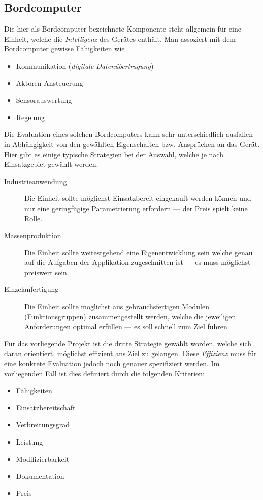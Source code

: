 \subsection{Bordcomputer}
\label{bordcomputer}
Die hier als Bordcomputer bezeichnete Komponente steht allgemein für eine
Einheit, welche die \emph{Intelligenz} des Gerätes enthält. Man assoziert
mit dem Bordcomputer gewisse Fähigkeiten wie
\begin{itemize}
	\item Kommunikation (\emph{digitale Datenübertragung})
	\item Aktoren-Ansteuerung
	\item Sensorauswertung
	\item Regelung
\end{itemize}

Die Evaluation eines solchen Bordcomputers kann sehr unterschiedlich 
ausfallen in Abhängigkeit von den gewählten Eigenschaften bzw. 
Ansprüchen an das Gerät. Hier gibt es einige typische Strategien bei der
Auswahl, welche je nach Einsatzgebiet gewählt werden.
\begin{description}
	\item[Industrieanwendung] Die Einheit sollte möglichst 
		Einsatzbereit eingekauft werden können und nur eine 
		geringfügige Parametrierung erfordern --- der Preis 
		spielt keine Rolle.
	\item[Massenproduktion] Die Einheit sollte weitestgehend eine
		Eigenentwicklung sein welche genau auf die Aufgaben
		der Applikation zugeschnitten ist --- es muss möglichst
		preiswert sein.
	\item[Einzelanfertigung] Die Einheit sollte möglichst aus 
		gebrauchsfertigen Modulen (Funktionsgruppen) 
		zusammengestellt werden, welche die jeweiligen 
		Anforderungen optimal erfüllen --- es soll schnell zum
		Ziel führen.
\end{description}

Für das vorliegende Projekt ist die dritte Strategie gewählt worden, 
welche sich daran orientiert, möglichst effizient ans Ziel zu gelangen.
Diese \emph{Effizienz} muss für eine konkrete Evaluation jedoch noch
genauer spezifiziert werden. Im vorliegenden Fall ist dies definiert
durch die folgenden Kriterien:

\begin{itemize}
	\item Fähigkeiten
	\item Einsatzbereitschaft
	\item Verbreitungsgrad
	\item Leistung
	\item Modifizierbarkeit
	\item Dokumentation
	\item Preis
\end{itemize}

